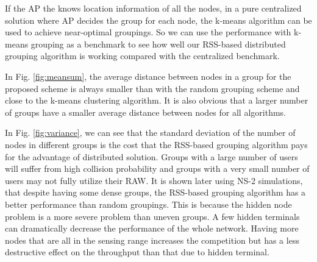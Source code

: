 
If the AP the knows location information of all the nodes, in a pure centralized solution where AP decides the group for each node, the k-means algorithm can be used to achieve near-optimal groupings. So we can use the performance with k-means grouping as a benchmark to see how well our RSS-based distributed grouping algorithm is working compared with the centralized benchmark.

In Fig. \ref{fig:meansum}, the average distance between nodes in a group for the proposed scheme is always smaller than with the random grouping scheme and close to the k-means clustering algorithm. It is also obvious that a larger number of groups have a smaller average distance between nodes for all algorithms. 

In Fig. \ref{fig:variance}, we can see that the standard deviation of the number of nodes in different groups is the cost that the RSS-based grouping algorithm pays for the advantage of distributed solution. Groups with a large number of users will suffer from high collision probability and groups with a very small number of users may not fully utilize their RAW. It is shown later using NS-2 simulations, that despite having some dense groups, the RSS-based grouping algorithm has a better performance than random groupings. This is because the hidden node problem is a more severe problem than uneven groups. A few hidden terminals can dramatically decrease the performance of the whole network. Having more nodes that are all in the sensing range increases the competition but has a less destructive effect on the throughput than that due to hidden terminal.



